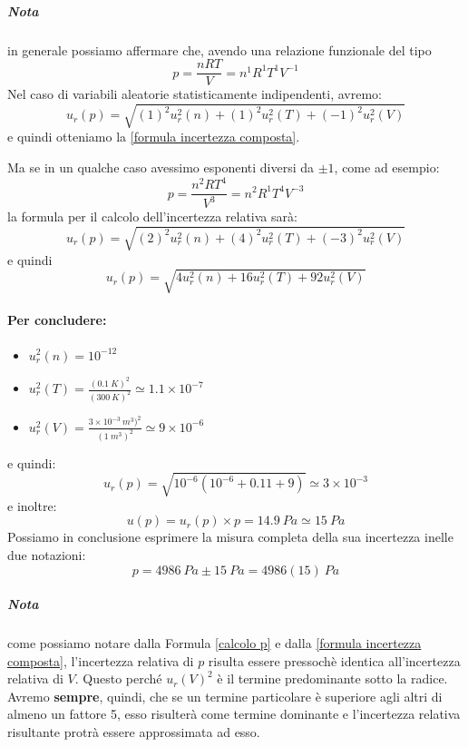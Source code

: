 \documentclass[a4paper,11pt]{report}
\begin{document}
\subparagraph*{Nota} in generale possiamo affermare che, avendo una relazione funzionale del tipo
$$
  p = \frac{nRT}{V} = n^1 R^1 T^1 V^{-1}
$$
Nel caso di variabili aleatorie statisticamente indipendenti, avremo:
$$
  u_r(p) = \sqrt{(1)^2u_r^2(n)+(1)^2u_r^2(T)+(-1)^2u_r^2(V)}
$$ e quindi otteniamo la \ref{formula incertezza composta}.

Ma se in un qualche caso avessimo esponenti diversi da $\pm 1$, come ad esempio:
$$
  p = \frac{n^2 R T^4}{V^3} = n^2 R^1 T^4 V^{-3}  
$$
la formula per il calcolo dell'incertezza relativa sarà:
$$
  u_r(p) = \sqrt{(2)^2u_r^2(n)+(4)^2u_r^2(T)+(-3)^2u_r^2(V)}
$$ e quindi
$$
  u_r(p) = \sqrt{4u_r^2(n)+16u_r^2(T)+92u_r^2(V)}  
$$
\paragraph{Per concludere:}
\begin{itemize}
  \item $u_r^2(n) = 10^{-12}$
  \item $u_r^2(T) = \frac{(0.1~K)^2}{(300~K)^2} \simeq 1.1\times 10^{-7}$
  \item $u_r^2(V) = \frac{3\times 10^{-3}~ m^3)^2}{(1~m^3)^2} \simeq 9\times 10^{-6}$
\end{itemize}
e quindi:
\begin{equation}
  \label{calcolo p}
  u_r(p) = \sqrt{10^{-6}(10^{-6}+0.11+9)} \simeq 3\times 10^{-3}
\end{equation}
e inoltre:
$$
  u(p) = u_r(p)\times p = 14.9~ Pa \simeq 15~Pa
$$
Possiamo in conclusione esprimere la misura completa della sua incertezza inelle due notazioni:
$$
  p = 4986~ Pa\pm 15~ Pa = 4986(15)~ Pa
$$
\subparagraph{Nota} come possiamo notare dalla Formula \ref{calcolo p} e dalla \ref{formula incertezza composta}, l'incertezza relativa di $p$ risulta essere pressochè identica all'incertezza relativa di $V$. Questo perché $u_r(V)^2$ è il termine predominante sotto la radice. Avremo \textbf{sempre}, quindi, che se un termine particolare è superiore agli altri di almeno un fattore 5, esso risulterà come termine dominante e l'incertezza relativa risultante protrà essere approssimata ad esso.
\end{document}

